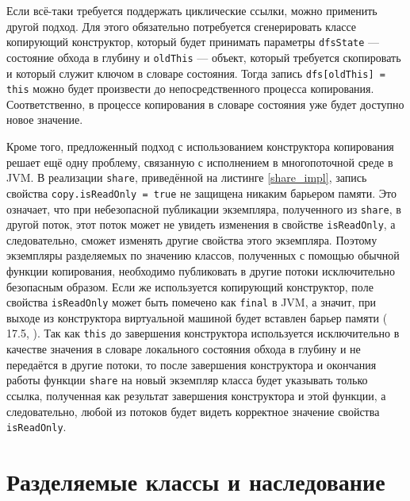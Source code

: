 \documentclass[specification,annotation,times]{itmo-student-thesis}
\begin{document}
Если всё-таки требуется поддержать циклические ссылки, можно применить другой подход.
Для этого обязательно потребуется сгенерировать классе копирующий конструктор, который будет принимать параметры \texttt{dfsState} --- состояние обхода в глубину и \texttt{oldThis} --- объект, который требуется скопировать и который служит ключом в словаре состояния.
Тогда запись \texttt{dfs[oldThis] = this} можно будет произвести до непосредственного процесса копирования. Соответственно, в процессе копирования в словаре состояния уже будет доступно новое значение.

Кроме того, предложенный подход с использованием конструктора копирования решает ещё одну проблему, связанную с исполнением в многопоточной среде в JVM.
В реализации \texttt{share}, приведённой на листинге \ref{share_impl}, запись свойства \texttt{copy.isReadOnly = true} не защищена никаким барьером памяти.
Это означает, что при небезопасной публикации экземпляра, полученного из \texttt{share}, в другой поток, этот поток может не увидеть изменения в свойстве \texttt{isReadOnly}, а следовательно, сможет изменять другие свойства этого экземпляра.
Поэтому экземпляры разделяемых по значению классов, полученных с помощью обычной функции копирования, необходимо публиковать в другие потоки исключительно безопасным образом.
Если же используется копирующий конструктор, поле свойства \texttt{isReadOnly} может быть помечено как \texttt{final} в JVM, а значит,
при выходе из конструктора виртуальной машиной будет вставлен барьер памяти (\cite{jvm8-spec} 17.5, \cite{shipilev-final}).
Так как \texttt{this} до завершения конструктора используется исключительно в качестве значения в словаре локального состояния обхода в глубину и не передаётся в другие потоки, то после завершения конструктора и окончания работы функции \texttt{share} на новый экземпляр класса будет указывать только ссылка, полученная как результат завершения конструктора и этой функции, а следовательно, любой из потоков будет видеть корректное значение свойства \texttt{isReadOnly}.

\section{Разделяемые классы и наследование}\label{inheritance}
\end{document}
